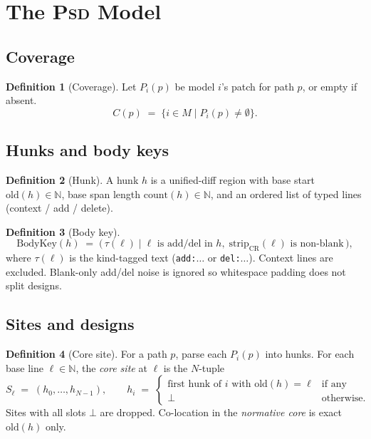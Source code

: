 \documentclass[
  11pt,
  a4paper,
  oneside,
  numbers=noenddot,
  abstract=true,
  headings=normal,
  DIV=11,
  BCOR=0mm,
]{scrartcl}
\theoremstyle{definition}
\newtheorem{definition}{Definition}[section]
\theoremstyle{plain}
\theoremstyle{remark}
\newcommand{\PSD}{\textsc{Psd}}
\newcommand{\BodyKey}{\mathrm{BodyKey}}
\begin{document}
\section{The \PSD{} Model}
\label{sec:model}

\subsection{Coverage}

\begin{definition}[Coverage]
\label{def:coverage}
Let $P_i(p)$ be model $i$'s patch for path $p$, or empty if absent.
\[
  C(p) \;=\; \{ i \in M \mid P_i(p) \neq \emptyset \}.
\]
\end{definition}

\subsection{Hunks and body keys}

\begin{definition}[Hunk]
\label{def:hunk}
A hunk $h$ is a unified-diff region with base start $\mathrm{old}(h)\in\mathbb{N}$,
base span length $\mathrm{count}(h)\in\mathbb{N}$, and an ordered list of
typed lines (context / add / delete).
\end{definition}

\begin{definition}[Body key]
\label{def:bodykey}
\[
  \BodyKey(h)
  \;=\;
  \bigl(\,
    \tau(\ell)\;\big|\;
    \ell\text{ is add/del in }h,\;
    \mathrm{strip}_{\mathrm{CR}}(\ell)\text{ is non-blank}
  \,\bigr),
\]
where $\tau(\ell)$ is the kind-tagged text (\texttt{add:}$\ldots$ or
\texttt{del:}$\ldots$). Context lines are excluded. Blank-only add/del
noise is ignored so whitespace padding does not split designs.
\end{definition}

\subsection{Sites and designs}

\begin{definition}[Core site]
\label{def:site}
For a path $p$, parse each $P_i(p)$ into hunks. For each base line
$\ell\in\mathbb{N}$, the \emph{core site} at $\ell$ is the $N$-tuple
\[
  S_\ell
  \;=\;
  (h_0,\ldots,h_{N-1}),
  \qquad
  h_i
  \;=\;
  \begin{cases}
    \text{first hunk of $i$ with $\mathrm{old}(h)=\ell$} & \text{if any}\\
    \bot & \text{otherwise.}
  \end{cases}
\]
Sites with all slots $\bot$ are dropped. Co-location in the
\emph{normative core} is exact $\mathrm{old}(h)$ only.
\end{definition}
\end{document}

